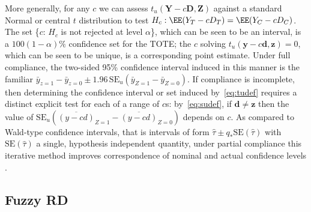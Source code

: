 More generally, for any $c$ we can assess
$t_{u}(\mathbf{Y}-c\mathbf{D}, \mathbf{Z})$ against a standard Normal
or central $t$ distribution to test
$H_{c}: \EE( Y_{T} - cD_{T}) =\EE (Y_{C} - cD_{C})$.
The set \{$c$:
$H_{c}$ is not rejected at level $\alpha$\}, which can be seen to be an interval, is a
$100(1-\alpha)\%$ confidence set for the TOTE; the $c$ solving
$t_{u}(\mathbf{y}-c\mathbf{d}, \mathbf{z}) = 0$, which can be seen to be unique, is a
corresponding point estimate.
Under full compliance, the two-sided 95\% confidence interval induced in this
manner is the familiar
$\bar{y}_{z=1} -\bar{y}_{z=0} \pm 1.96\, \mathrm{SE}_{u}(\bar{y}_{Z=1}
-\bar{y}_{Z=0})$.  If compliance is incomplete, then determining the
confidence interval or set induced by~\eqref{eq:tudef} requires a distinct explicit
test for each of a range of $c$s: by~\eqref{eq:sudef}, if $\mathbf{d}
\neq \mathbf{z}$ then the value
of $\mathrm{SE}_{u}(\overline{(y-c d)}_{Z=1}
-\overline{(y - c d)}_{Z=0})$ depends on $c$.  As compared to Wald-type
confidence intervals, that is intervals of form $\hat\tau \pm q_{*}
\mathrm{SE}(\hat\tau)$ with $\mathrm{SE}(\hat\tau)$ a single,
hypothesis independent quantity, under partial compliance this iterative method
improves correspondence of nominal and actual confidence levels
\citep[Sec.~7]{imbens:rose:2005,baiocchiChengSmall2014IVtutorial}.

\subsection{Fuzzy RD}